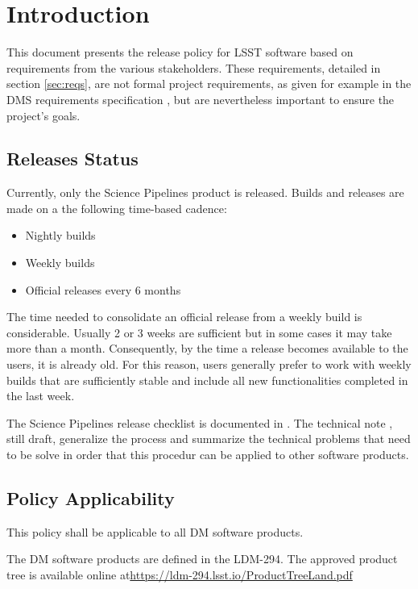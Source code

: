 \section{Introduction} \label{sec:intro}

This document presents the release policy for \gls{LSST} software based on requirements from the various stakeholders.
These requirements, detailed in section \ref{sec:reqs}, are not formal project requirements, as given for example in the \gls{DMS} requirements specification , but are nevertheless important to ensure the project's goals.


\subsection{Releases Status}\label{sec:sci}

Currently, only the \gls{Science Pipelines} product is released. 
Builds and releases are made on a the following time-based cadence:

\begin{itemize}
\item Nightly builds
\item Weekly builds
\item Official releases every 6 months
\end{itemize}

The time needed to consolidate an official release from a weekly build is considerable.
Usually 2 or 3 weeks are sufficient but in some cases it may take more than a month. 
Consequently, by the time a release becomes available to the users, it is already old.
For this reason, users generally prefer to work with weekly builds that are sufficiently stable and include all new functionalities completed in the last week.

The \gls{Science Pipelines} release checklist is documented in .
The technical note , still draft, generalize the process and summarize the technical problems that need to be solve in order that this procedur can be applied to other software products.


\subsection{Policy Applicability} \label{sec:applicability}

This policy shall be applicable to all \gls{DM} software products.

The \gls{DM} software products are defined in the LDM-294. 
The approved product tree is available online at\url{https://ldm-294.lsst.io/ProductTreeLand.pdf}


